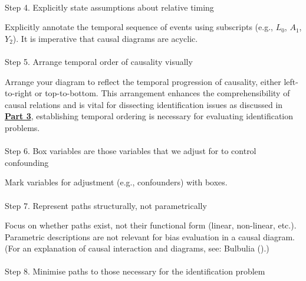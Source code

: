 \documentclass[
  single column]{article}
\makeatletter
\let\oldparagraph\paragraph
\renewcommand{\paragraph}{
    \@ifstar
      \xxxParagraphStar
      \xxxParagraphNoStar
  }
\newcommand{\xxxParagraphStar}[1]{\oldparagraph*{#1}\mbox{}}
\newcommand{\xxxParagraphNoStar}[1]{\oldparagraph{#1}\mbox{}}
\makeatother
\begin{document}
\paragraph{Step 4. Explicitly state assumptions about relative
timing}\label{step-4.-explicitly-state-assumptions-about-relative-timing}

Explicitly annotate the temporal sequence of events using subscripts
(e.g., \(L_0\), \(A_1\), \(Y_2\)). It is imperative that causal diagrams
are acyclic.

\paragraph{Step 5. Arrange temporal order of causality
visually}\label{step-5.-arrange-temporal-order-of-causality-visually}

Arrange your diagram to reflect the temporal progression of causality,
either left-to-right or top-to-bottom. This arrangement enhances the
comprehensibility of causal relations and is vital for dissecting
identification issues as discussed in \hyperref[sec-part3]{\textbf{Part
3}}, establishing temporal ordering is necessary for evaluating
identification problems.

\paragraph{Step 6. Box variables are those variables that we adjust for
to control
confounding}\label{step-6.-box-variables-are-those-variables-that-we-adjust-for-to-control-confounding}

Mark variables for adjustment (e.g., confounders) with boxes.

\paragraph{Step 7. Represent paths structurally, not
parametrically}\label{step-7.-represent-paths-structurally-not-parametrically}

Focus on whether paths exist, not their functional form (linear,
non-linear, etc.). Parametric descriptions are not relevant for bias
evaluation in a causal diagram. (For an explanation of causal
interaction and diagrams, see: Bulbulia
().)

\paragraph{Step 8. Minimise paths to those necessary for the
identification
problem}\label{step-8.-minimise-paths-to-those-necessary-for-the-identification-problem}
\end{document}
